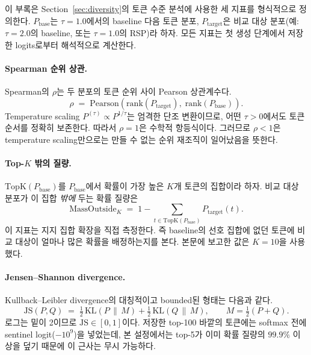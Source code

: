 이 부록은 Section~\ref{sec:diversity}의 토큰 수준 분석에 사용한 세 지표를 형식적으로 정의한다. $P_{\text{base}}$는 $\tau{=}1.0$에서의 baseline 다음 토큰 분포, $P_{\text{target}}$은 비교 대상 분포(예: $\tau{=}2.0$의 baseline, 또는 $\tau{=}1.0$의 RSP)라 하자. 모든 지표는 첫 생성 단계에서 저장한 logits로부터 해석적으로 계산한다.

\paragraph{Spearman 순위 상관.}
Spearman의 $\rho$는 두 분포의 토큰 순위 사이 Pearson 상관계수다.
\begin{equation}
\rho \;=\; \mathrm{Pearson}\!\left(\mathrm{rank}(P_{\text{target}}),\; \mathrm{rank}(P_{\text{base}})\right).
\end{equation}
Temperature scaling $P^{(\tau)} \propto P^{1/\tau}$는 엄격한 단조 변환이므로, 어떤 $\tau > 0$에서도 토큰 순서를 정확히 보존한다. 따라서 $\rho = 1$은 수학적 항등식이다. 그러므로 $\rho < 1$은 temperature scaling만으로는 만들 수 없는 순위 재조직이 일어났음을 뜻한다.

\paragraph{Top-$K$ 밖의 질량.}
$\mathrm{TopK}(P_{\text{base}})$를 $P_{\text{base}}$에서 확률이 가장 높은 $K$개 토큰의 집합이라 하자. 비교 대상 분포가 이 집합 \emph{밖에} 두는 확률 질량은
\begin{equation}
\mathrm{MassOutside}_K \;=\; 1 - \sum_{t \in \mathrm{TopK}(P_{\text{base}})} P_{\text{target}}(t).
\end{equation}
이 지표는 지지 집합 확장을 직접 측정한다. 즉 baseline의 선호 집합에 없던 토큰에 비교 대상이 얼마나 많은 확률을 배정하는지를 본다. 본문에 보고한 값은 $K = 10$을 사용했다.

\paragraph{Jensen--Shannon divergence.}
Kullback--Leibler divergence의 대칭적이고 bounded된 형태는 다음과 같다.
\begin{equation}
\mathrm{JS}(P, Q) \;=\; \tfrac{1}{2}\,\mathrm{KL}(P \,\|\, M) + \tfrac{1}{2}\,\mathrm{KL}(Q \,\|\, M), \qquad M = \tfrac{1}{2}(P + Q).
\end{equation}
로그는 밑이 2이므로 $\mathrm{JS} \in [0, 1]$이다. 저장한 top-100 바깥의 토큰에는 softmax 전에 sentinel logit($-10^9$)을 넣었는데, 본 설정에서는 top-5가 이미 확률 질량의 $99.9\%$ 이상을 덮기 때문에 이 근사는 무시 가능하다.

